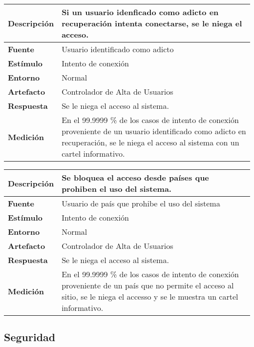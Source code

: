 \begin{center}
  \begin{tabular}{| l | p{10cm} | }
    \hline
	\textbf{Descripción} & Si un usuario idenficado como adicto en recuperación intenta conectarse, se le niega el acceso. \\  \hline
	\textbf{Fuente} & Usuario identificado como adicto\\  \hline
	\textbf{Estímulo} & Intento de conexión\\  \hline
	\textbf{Entorno} & Normal\\  \hline
	\textbf{Artefacto} & Controlador de Alta de Usuarios\\  \hline
	\textbf{Respuesta} & Se le niega el acceso al sistema.\\  \hline
	\textbf{Medición} & En el 99.9999 \% de los casos de intento de conexión proveniente de un usuario identificado como adicto en recuperación, se le niega el acceso al sistema con un cartel informativo.\\  \hline
  \end{tabular}
\end{center}  

\begin{center}
  \begin{tabular}{| l | p{10cm} | }
    \hline
	\textbf{Descripción} & Se bloquea el acceso desde países que prohiben el uso del sistema.\\  \hline
	\textbf{Fuente} & Usuario de país que prohibe el uso del sistema\\  \hline
	\textbf{Estímulo} & Intento de conexión\\  \hline
	\textbf{Entorno} & Normal\\  \hline
	\textbf{Artefacto} & Controlador de Alta de Usuarios\\  \hline
	\textbf{Respuesta} & Se le niega el acceso al sistema.\\  \hline
	\textbf{Medición} & En el 99.9999 \% de los casos de intento de conexión proveniente de un país que no permite el acceso al sitio, se le niega el accesso y se le muestra un cartel informativo.\\  \hline
  \end{tabular}
\end{center} 


\subsection{Seguridad}

